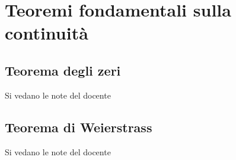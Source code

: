 \section{Teoremi fondamentali sulla continuità}

\subsection{Teorema degli zeri}
Si vedano le note del docente

\subsection{Teorema di Weierstrass}
Si vedano le note del docente
